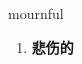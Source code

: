 
\begin{frame}
{\huge mournful}
\begin{center}
\begin{enumerate}\Large
  \item \textbf{悲伤的}
\end{enumerate}
\end{center}
\end{frame}

